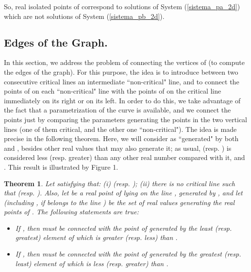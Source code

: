 \documentclass{elsart}
\newtheorem{theorem}{{\bf Theorem}}
\begin{document}
So, real isolated points of  correspond to solutions of System
(\ref{sistema_pa_2d}) which are not solutions of System
(\ref{sistema_pb_2d}).








\subsection{Edges of the Graph.} \label{edges}

In this section, we address the problem of connecting the vertices
of  (to compute the edges of the graph). For this
purpose, the idea is to introduce between two consecutive critical
lines an intermediate ``non-critical" line, and to connect the
points of  on each ``non-critical" line with the
points of  on the critical line immediately on its
right or on its left. In order to do this, we take advantage of
the fact that a parametrization of the curve is available, and we
connect the points just by comparing the parameters generating the
points in the two vertical lines (one of them critical, and the
other one ``non-critical"). The idea is made precise in the
following theorem. Here, we will consider  as
``generated" by both  and , besides other real
values that may also generate it; as usual,  (resp.
) is considered less (resp. greater) than any other real
number compared with it, and . This result is
illustrated by Figure 1.

\begin{theorem} \label{th-connect}
Let  satisfying that: (i)  (resp.
); (ii) there is no critical line  such that
 (resp. ). Also, let  be a
real point of  lying on the line , generated
by , and let  (including ,
if  belongs to the line ) be the set of real
values generating the real points of .
The following statements are true:
\begin{itemize}
\item [(1)] If , then  must be connected with the point  of  generated by
the least (resp. greatest) element of  which is
greater (resp. less) than .
    \item [(2)] If , then  must be connected with the point  of  generated by the greatest (resp. least) element of  which is less (resp. greater) than .
\end{itemize}
\end{theorem}
\end{document}
